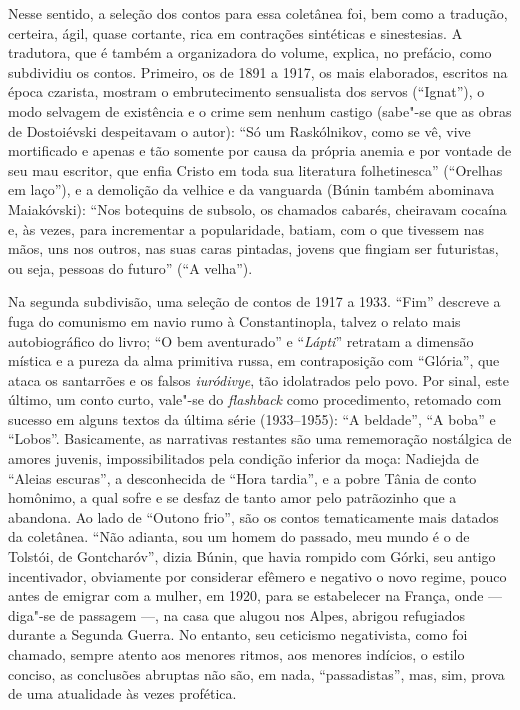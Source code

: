 Nesse sentido, a seleção dos contos para essa coletânea foi,
bem como a tradução, certeira, ágil, quase cortante, rica em
contrações sintéticas e sinestesias. A tradutora, que é também
a organizadora do volume, explica, no prefácio, como subdividiu
os contos. Primeiro, os de 1891 a 1917, os mais elaborados,
escritos na época czarista, mostram o embrutecimento sensualista
dos servos (``Ignat''), o modo selvagem de existência e o crime
sem nenhum castigo (sabe"-se que as obras de Dostoiévski
despeitavam o autor): ``Só um Raskólnikov, como se vê, vive
mortificado e apenas e tão somente por causa da própria anemia
e por vontade de seu mau escritor, que enfia Cristo em toda sua
literatura folhetinesca'' (``Orelhas em laço''), e a demolição
da velhice e da vanguarda (Búnin também abominava Maiakóvski):
``Nos botequins de subsolo, os chamados cabarés, cheiravam
cocaína e, às vezes, para incrementar a popularidade, batiam,
com o que tivessem nas mãos, uns nos outros, nas suas caras
pintadas, jovens que fingiam ser futuristas, ou seja, pessoas
do futuro'' (``A velha''). 

Na segunda subdivisão, uma seleção de contos de 1917 a 1933.
``Fim'' descreve a fuga do comunismo em navio rumo à Constantinopla,
talvez o relato mais autobiográfico do livro; ``O bem aventurado''
e ``\emph{Lápti}'' retratam  a dimensão mística e a pureza da alma
primitiva russa, em contraposição com ``Glória'', que ataca os
santarrões e os falsos \emph{iuródivye}, tão idolatrados pelo
povo. Por sinal, este último, um conto curto, vale"-se do
\emph{flashback} como procedimento, retomado com sucesso em
alguns textos da última série (1933--1955): ``A beldade'',
``A boba'' e ``Lobos''. Basicamente, as narrativas restantes
são uma rememoração nostálgica de amores juvenis, impossibilitados
pela condição inferior da moça: Nadiejda de ``Aleias escuras'',
a desconhecida de ``Hora tardia'', e a pobre Tânia de conto
homônimo, a qual sofre e se desfaz de tanto amor pelo patrãozinho
que a abandona. Ao lado de ``Outono frio'', são os contos
tematicamente mais datados da coletânea. ``Não adianta, sou um
homem do passado, meu mundo é o de Tolstói, de Gontcharóv'',
dizia Búnin, que havia rompido com Górki, seu antigo incentivador,
obviamente por considerar efêmero e negativo o novo regime,
pouco antes de emigrar com a mulher, em 1920, para se estabelecer
na França, onde --- diga"-se de passagem ---,  na casa que
alugou nos Alpes, abrigou refugiados durante a Segunda Guerra.
No entanto, seu ceticismo negativista, como foi chamado, sempre
atento aos menores ritmos, aos menores indícios, o estilo conciso,
as conclusões abruptas não são, em nada, ``passadistas'', mas,
sim, prova de uma atualidade às vezes profética. 

